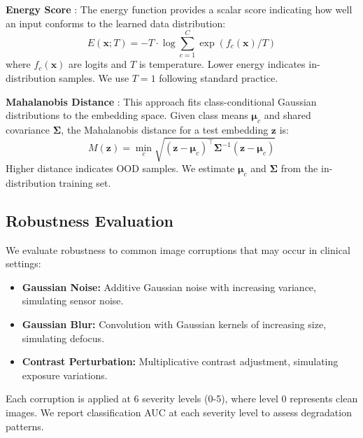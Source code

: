 \documentclass[11pt,a4paper]{article}
\begin{document}
\textbf{Energy Score} \citep{liu2020energy}: The energy function provides a scalar score indicating how well an input conforms to the learned data distribution:
\begin{equation}
    E(\mathbf{x}; T) = -T \cdot \log \sum_{c=1}^{C} \exp(f_c(\mathbf{x}) / T)
\end{equation}
where $f_c(\mathbf{x})$ are logits and $T$ is temperature. Lower energy indicates in-distribution samples. We use $T=1$ following standard practice.

\textbf{Mahalanobis Distance} \citep{lee2018simple}: This approach fits class-conditional Gaussian distributions to the embedding space. Given class means $\boldsymbol{\mu}_c$ and shared covariance $\boldsymbol{\Sigma}$, the Mahalanobis distance for a test embedding $\mathbf{z}$ is:
\begin{equation}
    M(\mathbf{z}) = \min_{c} \sqrt{(\mathbf{z} - \boldsymbol{\mu}_c)^\top \boldsymbol{\Sigma}^{-1} (\mathbf{z} - \boldsymbol{\mu}_c)}
\end{equation}
Higher distance indicates OOD samples. We estimate $\boldsymbol{\mu}_c$ and $\boldsymbol{\Sigma}$ from the in-distribution training set.

\subsection{Robustness Evaluation}

We evaluate robustness to common image corruptions that may occur in clinical settings:

\begin{itemize}[leftmargin=*]
    \item \textbf{Gaussian Noise:} Additive Gaussian noise with increasing variance, simulating sensor noise.
    \item \textbf{Gaussian Blur:} Convolution with Gaussian kernels of increasing size, simulating defocus.
    \item \textbf{Contrast Perturbation:} Multiplicative contrast adjustment, simulating exposure variations.
\end{itemize}

Each corruption is applied at 6 severity levels (0-5), where level 0 represents clean images. We report classification AUC at each severity level to assess degradation patterns.

\end{document}
